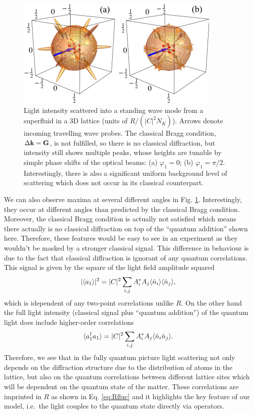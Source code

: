 \begin{figure}[htbp!]
  \centering
  \includegraphics[width=\linewidth]{Ep1}
  \caption[Light Scattering Angular Distribution]{Light intensity
    scattered into a standing wave mode from a superfluid in a 3D
    lattice (units of $R/(|C|^2N_K)$). Arrows denote incoming
    travelling wave probes. The classical Bragg condition,
    $\Delta \mathbf{k} = \mathbf{G}$, is not fulfilled, so there is no classical
    diffraction, but intensity still shows multiple peaks, whose
    heights are tunable by simple phase shifts of the optical beams:
    (a) $\varphi_1=0$; (b) $\varphi_1=\pi/2$. Interestingly, there is
    also a significant uniform background level of scattering which
    does not occur in its classical counterpart. }
  \label{fig:scattering}
\end{figure}

We can also observe maxima at several different angles in
Fig. \ref{fig:scattering}. Interestingly, they occur at different
angles than predicted by the classical Bragg condition. Moreover, the
classical Bragg condition is actually not satisfied which means there
actually is no classical diffraction on top of the ``quantum
addition'' shown here. Therefore, these features would be easy to see
in an experiment as they wouldn't be masked by a stronger classical
signal.  This difference in behaviour is due to the fact that
classical diffraction is ignorant of any quantum correlations. This
signal is given by the square of the light field amplitude squared
\begin{equation}
  |\langle a_1 \rangle|^2 = |C|^2 \sum_{i,j} A_i^*
  A_j \langle \hat{n}_i \rangle \langle \hat{n}_j \rangle,
\end{equation}
which is idependent of any two-point correlations unlike $R$. On the
other hand the full light intensity (classical signal plus ``quantum
addition'') of the quantum light does include higher-order
correlations
\begin{equation}
  \langle a^\dagger_1 a_1 \rangle = |C|^2 \sum_{i,j} A_i^*
  A_j \langle \hat{n}_i \hat{n}_j \rangle.
\end{equation}
Therefore, we see that in the fully quantum picture light scattering
not only depends on the diffraction structure due to the distribution
of atoms in the lattice, but also on the quantum correlations between
different lattice sites which will be dependent on the quantum state
of the matter. These correlations are imprinted in $R$ as shown in
Eq. \eqref{eq:Rfluc} and it highlights the key feature of our model,
i.e.~the light couples to the quantum state directly via operators.

